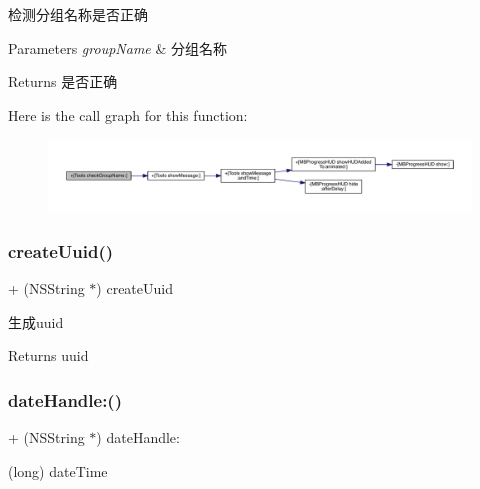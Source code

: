 检测分组名称是否正确


\begin{DoxyParams}{Parameters}
{\em group\+Name} & 分组名称\\
\hline
\end{DoxyParams}
\begin{DoxyReturn}{Returns}
是否正确 
\end{DoxyReturn}
Here is the call graph for this function\+:\nopagebreak
\begin{figure}[H]
\begin{center}
\leavevmode
\includegraphics[width=350pt]{interface_tools_a72ce36fa142481b701d46cee384d719e_cgraph}
\end{center}
\end{figure}
\mbox{\label{interface_tools_a8ed4d3ec35619bf99597545eee94babc}} 
\subsubsection{\texorpdfstring{create\+Uuid()}{createUuid()}}
{\footnotesize\ttfamily + (N\+S\+String $\ast$) create\+Uuid \begin{DoxyParamCaption}{ }\end{DoxyParamCaption}}

生成uuid

\begin{DoxyReturn}{Returns}
uuid 
\end{DoxyReturn}
\mbox{\label{interface_tools_ad2c2f6dee3ae9f63642291056d8c3f40}} 
\subsubsection{\texorpdfstring{date\+Handle\+:()}{dateHandle:()}}
{\footnotesize\ttfamily + (N\+S\+String $\ast$) date\+Handle\+: \begin{DoxyParamCaption}\item[{(long)}]{date\+Time }\end{DoxyParamCaption}}

